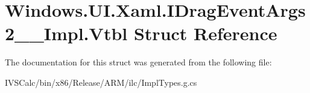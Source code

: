 \hypertarget{struct_windows_1_1_u_i_1_1_xaml_1_1_i_drag_event_args2_____impl_1_1_vtbl}{}\section{Windows.\+U\+I.\+Xaml.\+I\+Drag\+Event\+Args2\+\_\+\+\_\+\+Impl.\+Vtbl Struct Reference}
\label{struct_windows_1_1_u_i_1_1_xaml_1_1_i_drag_event_args2_____impl_1_1_vtbl}


The documentation for this struct was generated from the following file\+:\begin{DoxyCompactItemize}
\item 
I\+V\+S\+Calc/bin/x86/\+Release/\+A\+R\+M/ilc/Impl\+Types.\+g.\+cs\end{DoxyCompactItemize}
